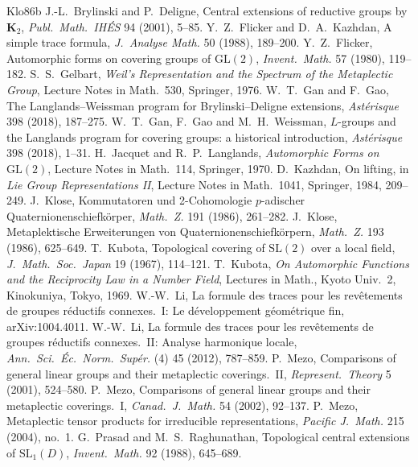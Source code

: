 \documentclass[12pt]{article}
\newcommand{\GL}{\mathrm{GL}}
\newcommand{\SL}{\mathrm{SL}}
\theoremstyle{plain}
\theoremstyle{definition}
\begin{document}
\begin{thebibliography}{Klo86b}
 J.-L.~Brylinski and P.~Deligne, Central extensions of reductive groups by $\mathbf K_2$, \emph{Publ.\ Math.\ IH\'ES} 94 (2001), 5--85.
 Y.~Z.~Flicker and D.~A.~Kazhdan, A simple trace formula, \emph{J.\ Analyse Math.} 50 (1988), 189--200.
 Y.~Z.~Flicker, Automorphic forms on covering groups of $\GL(2)$, \emph{Invent.\ Math.} 57 (1980), 119--182.
 S.~S.~Gelbart, \emph{Weil's Representation and the Spectrum of the Metaplectic Group}, Lecture Notes in Math.\ 530, Springer, 1976.
 W.~T.~Gan and F.~Gao, The Langlands--Weissman program for Brylinski--Deligne extensions, \emph{Ast\'erisque} 398 (2018), 187--275.
 W.~T.~Gan, F.~Gao and M.~H.~Weissman, $L$-groups and the Langlands program for covering groups: a historical introduction, \emph{Ast\'erisque} 398 (2018), 1--31.
 H.~Jacquet and R.~P.~Langlands, \emph{Automorphic Forms on $\GL(2)$}, Lecture Notes in Math.\ 114, Springer, 1970.
 D.~Kazhdan, On lifting, in \emph{Lie Group Representations II}, Lecture Notes in Math.\ 1041, Springer, 1984, 209--249.
 J.~Klose, Kommutatoren und 2-Cohomologie $p$-adischer Quaternionenschiefk\"orper, \emph{Math.\ Z.} 191 (1986), 261--282.
 J.~Klose, Metaplektische Erweiterungen von Quaternionenschiefk\"orpern, \emph{Math.\ Z.} 193 (1986), 625--649.
 T.~Kubota, Topological covering of $\SL(2)$ over a local field, \emph{J.\ Math.\ Soc.\ Japan} 19 (1967), 114--121.
 T.~Kubota, \emph{On Automorphic Functions and the Reciprocity Law in a Number Field}, Lectures in Math., Kyoto Univ.\ 2, Kinokuniya, Tokyo, 1969.
 W.-W.~Li, La formule des traces pour les rev\^etements de groupes r\'eductifs connexes.\ I: Le d\'eveloppement g\'eom\'etrique fin, arXiv:1004.4011.
 W.-W.~Li, La formule des traces pour les rev\^etements de groupes r\'eductifs connexes.\ II: Analyse harmonique locale, \emph{Ann.\ Sci.\ \'Ec.\ Norm.\ Sup\'er.} (4) 45 (2012), 787--859.
 P.~Mezo, Comparisons of general linear groups and their metaplectic coverings.\ II, \emph{Represent.\ Theory} 5 (2001), 524--580.
 P.~Mezo, Comparisons of general linear groups and their metaplectic coverings.\ I, \emph{Canad.\ J.\ Math.} 54 (2002), 92--137.
 P.~Mezo, Metaplectic tensor products for irreducible representations, \emph{Pacific J.\ Math.} 215 (2004), no.~1.
 G.~Prasad and M.~S.~Raghunathan, Topological central extensions of $\mathrm{SL}_1(D)$, \emph{Invent.\ Math.} 92 (1988), 645--689.

\end{thebibliography}
\end{document}
